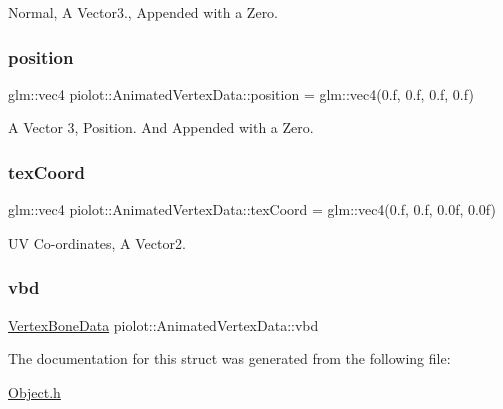 Normal, A Vector3., Appended with a Zero. 

\mbox{\label{structpiolot_1_1_animated_vertex_data_a9947f0e7811c173ff80c1cf345ec5d42}} 
\subsubsection{\texorpdfstring{position}{position}}
{\footnotesize\ttfamily glm\+::vec4 piolot\+::\+Animated\+Vertex\+Data\+::position = glm\+::vec4(0.f, 0.f, 0.f, 0.f)}



A Vector 3, Position. And Appended with a Zero. 

\mbox{\label{structpiolot_1_1_animated_vertex_data_ad8c5dfde767f37338b9f5497081ae0e6}} 
\subsubsection{\texorpdfstring{tex\+Coord}{texCoord}}
{\footnotesize\ttfamily glm\+::vec4 piolot\+::\+Animated\+Vertex\+Data\+::tex\+Coord = glm\+::vec4(0.f, 0.f, 0.\+0f, 0.\+0f)}



UV Co-\/ordinates, A Vector2. 

\mbox{\label{structpiolot_1_1_animated_vertex_data_a8c62a1712805dbfeb4f136c9f5bd90f3}} 
\subsubsection{\texorpdfstring{vbd}{vbd}}
{\footnotesize\ttfamily \mbox{\hyperlink{structpiolot_1_1_vertex_bone_data}{Vertex\+Bone\+Data}} piolot\+::\+Animated\+Vertex\+Data\+::vbd}



The documentation for this struct was generated from the following file\+:\begin{DoxyCompactItemize}
\item 
\mbox{\hyperlink{_object_8h}{Object.\+h}}\end{DoxyCompactItemize}
